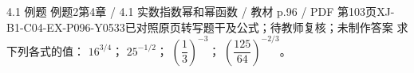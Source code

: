 \par\noindent\begin{minipage}{\linewidth}
\begin{bankitem}{4.1 例题 例题2}{第4章 / 4.1 实数指数幂和幂函数 / 教材 p.96 / PDF 第103页}{XJ-B1-C04-EX-P096-Y0533}{已对照原页转写题干及公式；待教师复核；未制作答案}
求下列各式的值：
$16^{3/4}$；
$25^{-1/2}$；
$\left(\dfrac13\right)^{-3}$；
$\left(\dfrac{125}{64}\right)^{-2/3}$。
\end{bankitem}
\end{minipage}\par\medskip

